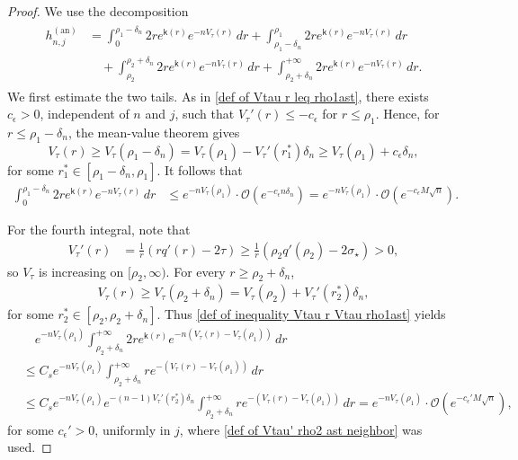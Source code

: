 \documentclass[a4paper]{article}
\numberwithin{equation}{section}
\begin{document}
\begin{proof}
We use the decomposition
\begin{align}
\begin{split}
\label{def of decomposition middle hole}
h_{n,j}^{(\mathrm{an})}
&=
\int_{0}^{\rho_1-\delta_n}2re^{\mathsf{k}(r)}e^{-nV_{\tau}(r)}\,dr
+
\int_{\rho_1-\delta_n}^{\rho_1}2re^{\mathsf{k}(r)}e^{-nV_{\tau}(r)}\,dr
\\
&\quad
+\int_{\rho_2}^{\rho_2+\delta_n}2re^{\mathsf{k}(r)}e^{-nV_{\tau}(r)}\,dr
+\int_{\rho_2+\delta_n}^{+\infty}2re^{\mathsf{k}(r)}e^{-nV_{\tau}(r)}\,dr. 
\end{split}
\end{align}
We first estimate the two tails. As in \eqref{def of Vtau r leq rho1ast}, there exists $c_\epsilon>0$, independent of $n$ and $j$, such that $V_\tau'(r)\leq-c_\epsilon$ for $r\leq\rho_1$. Hence, for $r\leq\rho_1-\delta_n$, the mean-value theorem gives
\[
V_{\tau}(r)\geq V_{\tau}(\rho_1-\delta_n)=V_{\tau}(\rho_1)-V_{\tau}'(r_{1}^{\ast})\delta_n\geq  V_{\tau}(\rho_1)+c_{\epsilon}\delta_n,
\]
for some $r_1^{\ast}\in[\rho_1-\delta_n,\rho_1]$.
It follows that
\begin{align*}
\int_{0}^{\rho_1-\delta_n}2re^{\mathsf{k}(r)}e^{-nV_{\tau}(r)}\,dr
&\leq
e^{-nV_{\tau}(\rho_1)}\cdot
\mathcal{O}(
e^{-c_{\epsilon}n\delta_n})
=e^{-nV_{\tau}(\rho_1)}\cdot \mathcal{O}(e^{-c_{\epsilon}M\sqrt n}).
\end{align*}

For the fourth integral, note that
\begin{align}
\label{def of Vtau' rho2 ast neighbor}
V_{\tau}'(r)&=\frac{1}{r}(rq'(r)-2\tau)
\geq\frac{1}{r}(\rho_2q'(\rho_2)-2\sigma_{\star})>0,
\end{align}
so $V_\tau$ is increasing on $[\rho_2,\infty)$. For every $r\geq\rho_2+\delta_n$,
\begin{align*}
    V_{\tau}(r)\geq V_{\tau}(\rho_2+\delta_n)=V_{\tau}(\rho_2)+V_{\tau}'(r_2^{\ast})\delta_n,
\end{align*}
for some $r_2^{\ast}\in[\rho_2,\rho_2+\delta_n]$. Thus \eqref{def of inequality Vtau r Vtau rho1ast} yields
\begin{align*}
  &\quad e^{-nV_{\tau}(\rho_1)}\int_{\rho_2+\delta_n}^{+\infty}2re^{\mathsf{k}(r)}e^{-n(V_{\tau}(r)-V_{\tau}(\rho_1))}\,dr
  \\
    &
    \leq
    C_s e^{-nV_{\tau}(\rho_1)}
    \int_{\rho_2+\delta_n}^{+\infty}re^{-(V_{\tau}(r)-V_{\tau}(\rho_1))}\,dr
    \\
    &\leq C_s e^{-nV_{\tau}(\rho_1)}e^{-(n-1)V_{\tau}'(r_2^{\ast})\delta_n}\int_{\rho_2+\delta_n}^{+\infty}r e^{-(V_{\tau}(r)-V_{\tau}(\rho_1))}\,dr
    =e^{-nV_{\tau}(\rho_1)}\cdot \mathcal{O}(e^{-c_{\epsilon}'M\sqrt n}),
\end{align*}
for some $c_\epsilon'>0$, uniformly in $j$, where \eqref{def of Vtau' rho2 ast neighbor} was used.



\end{proof}
\end{document}
